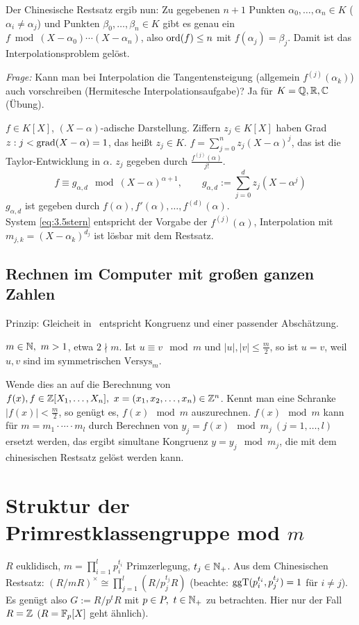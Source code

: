 \documentclass[a4paper,twoside,DIV15,BCOR12mm]{scrbook}
\begin{document}
Der Chinesische Restsatz ergib nun: Zu gegebenen $n+1$ Punkten
$\alpha_0, \ldots, \alpha_n \in K$ ($\alpha_i \ne \alpha_j$) und
Punkten $\beta_0, \ldots, \beta_n\in K$ gibt es genau ein $f \bmod
(X-\alpha_0)\cdots(X-\alpha_n)$, also $\mathop{\rm ord}\nolimits(f) \le n$ mit
$f(\alpha_j) = \beta_j$. Damit ist das Interpolationsproblem gelöst.


\emph{Frage:} Kann man bei Interpolation die Tangentensteigung
(allgemein $f^{(j)}(\alpha_k)$) auch vorschreiben (Hermitesche
Interpolationsaufgabe)? Ja für $K=\mathbb{Q}, \mathbb{R}, \mathbb{C}$ (Übung).

$f\in K[X]$, $(X-\alpha)$-adische Darstellung. Ziffern $z_j \in
K[X]$ haben Grad $z:j < \mathop{\rm grad}\nolimits (X-\alpha)=1$, das heißt $z_j \in K$.
$f=\sum_{j=0}^n z_j (X-\alpha)^j$, das ist die Taylor-Entwicklung in
$\alpha$. $z_j$ gegeben durch $\frac{f^{(j)}(\alpha)}{j!}$.
\begin{equation}\label{eq:3.5stern}
    f \equiv g_{\alpha,d} \mod (X-\alpha)^{\alpha+1}, \qquad
    g_{\alpha,d}:=\sum_{j=0}^d z_j(X-\alpha^j)
\end{equation}
$g_{\alpha,d}$ ist gegeben durch
$f(\alpha),f'(\alpha),\dotsc,f^{(d)}(\alpha)$.\\System
\eqref{eq:3.5stern} entspricht der Vorgabe der $f^{(j)}(\alpha)$,
Interpolation mit $m_{j,k}=(X-\alpha_k)^{d_j}$ ist lösbar mit dem
Restsatz.

\subsection{Rechnen im Computer mit großen ganzen Zahlen}

Prinzip: Gleicheit in \MdZ\ entspricht Kongruenz und einer passender
Abschätzung.
\begin{bemerkung}
    $m\in\mathbb{N},\ m>1$, etwa $2 \nmid m$. Ist $u \equiv v \mod m$ und
    $|u|,|v|\leq \frac{m}{2}$, so ist $u=v$, weil $u,v$ sind im
    symmetrischen $\text{Versys}_m$.
\end{bemerkung}
Wende dies an auf die Berechnung von $f(x), f\in
\mathbb{Z}[X_1,\dotsc,X_n],\ x=(x_1,x_2,\dotsc,x_n) \in \mathbb{Z}^n$. Kennt man
eine Schranke $|f(x)|<\frac{m}{2}$, so genügt es, $f(x) \mod m$
auszurechnen. $f(x) \mod m$ kann für $m=m_1 \cdot \dotsb \cdot m_l$
durch Berechnen von $y_j=f(x) \mod m_j\ (j=1,\dotsc,l)$ ersetzt
werden, das ergibt simultane Kongruenz $y=y_j \mod m_j$, die mit dem
chinesischen Restsatz gelöst werden kann.

\section{Struktur der Primrestklassengruppe mod $m$}
$R$ euklidisch, $m=\prod_{i=1}^l p_i^{t_i}$ Primzerlegung, $t_j \in
\mathbb{N}_+$. Aus dem Chinesischen Restsatz: $(R/mR)^{\times} \cong
\prod_{j=1}^l (R/p_j^{t_j} R)$ (beachte:
$\mathop{\rm ggT}\nolimits(p_i^{t_i},p_j^{t_j})=1$ für $i \neq j$). Es genügt also
$G:=R/p^t R$ mit $p\in P,\ t\in \mathbb{N}_+$ zu betrachten. Hier nur der
Fall $R=\mathbb{Z}$ $(R=\mathbb{F}_p[X ]$ geht ähnlich).
\end{document}
